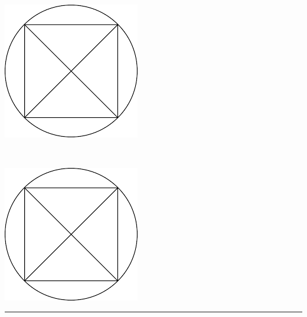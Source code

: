 \begin{center}
    \begin{minipage}{0.2\textwidth}
        \includegraphics[width=0.68\linewidth]{./images/icon1.png}
    \end{minipage}%
    \begin{minipage}{0.59\textwidth}
        \centering
        \unin \\
        \small
        \udepartment
    \end{minipage}%
    \begin{minipage}{0.2\textwidth}
        \raggedleft
        \includegraphics[width=0.68\linewidth]{./images/icon2.png}
    \end{minipage}
    \vspace{5pt} 
    \hrule
\end{center}

